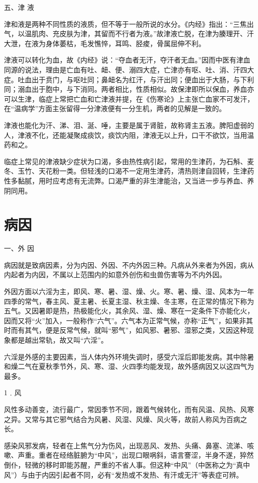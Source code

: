 \documentclass[a4paper,12pt,UTF8,twoside]{ctexbook}
\begin{document}
五、津 液

津和液是两种不同性质的液质，但不等于一般所说的水分。《内经》指出：“三焦出气，以温肌肉、充皮肤为津，其留而不行者为液。”故津液亡脱，在津为腠理开、汗大泄，在液为身体萎枯，毛发憔悴，耳鸣、胫痠，骨属屈伸不利。

津液可以转化为血，故《内经》说：“夺血者无汗，夺汗者无血。”因而中医有津血同源的说法，理由是亡血有吐、衄、便、溺四大症，亡津亦有呕、吐、消、汗四大症。吐血出于贲门，与呕吐同；鼻衄名为红汗，与汗出同；便血出于大肠，与下利同；溺血出于胞中，与下消同。两者相比，性质相似。故保津即所以保血，养血亦可以生津，临症上常把亡血和亡津液并提，在《伤寒论》上主张亡血家不可发汗，在“温病学”方面主张留得一分津液便有一分生机，两者的见解是一致的。

津液也能化为汗、涕、泪、涎、唾，主要是属于肾脏，故称肾主五液。脾阳虚弱的人，津液不化，还能凝聚成痰饮，痰饮内阻，津液无以上升，口干不欲饮，当用温药和之。

临症上常见的津液缺少症状为口渴，多由热性病引起，常用的生津药，为石斛、麦冬、玉竹、天花粉一类。但轻浅的口渴不一定用生津药，清热则津自回转，生津药性多黏腻，用时应考虑有无流弊。口渴严重的非生津能治，又当进一步与养血、养阴同用。

\section{病因}

一、外 因

病因就是致病因素，分为内因、外因、不内外因三种。凡病从外来者为外因，病从内起者为内因，不属以上范围内的如意外创伤和虫兽伤害等为不内外因。

外因方面以六淫为主，即风、寒、暑、湿、燥、火。寒、暑、燥、湿、风本为一年四季的常气，春主风、夏主暑、长夏主湿、秋主燥、冬主寒，在正常的情况下称为五气。又因暑即是热，热极能化火，其余风、湿、燥、寒在一定条件下亦能化火，因而又将“火”加入，一般称作“六气”。六气本为正常气候，亦称“正气”，如果非其时而有其气，便是反常气候，就叫“邪气”，如风邪、暑邪、湿邪之类，又因这种现象都是越出常轨，故又叫“六淫”。

六淫是外感的主要因素，当人体内外环境失调时，感受六淫后即能发病。其中除暑和燥二气在夏秋季节外，风、寒、湿、火四季均能发现，故外感病因又以这四气为最多。

1﹒风

风性多动善变，流行最广，常因季节不同，跟着气候转化，而有风温、风热、风寒之异。又常与其它邪气结合为风暑、风湿、风燥、风火等，故前人称风为百病之长。

感染风邪发病，轻者在上焦气分为伤风，出现恶风、发热、头痛、鼻塞、流涕、咳嗽、声重。重者在经络脏腑为“中风”，出现口眼㖞斜，语言謇涩，半身不遂，猝然倒仆，轻微的移时即能苏醒，严重的不省人事。但这种“中风”（中医称之为“真中风”）与由于内因引起者不同，必有“发热或不发热、有汗或无汗”等表症可辨。
\end{document}
